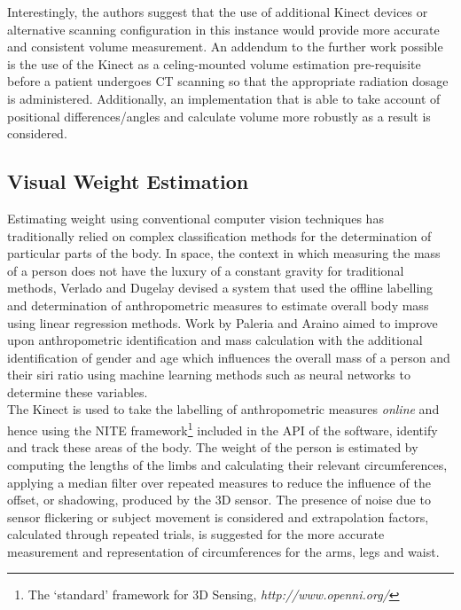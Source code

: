 Interestingly, the authors suggest that the use of additional Kinect devices or alternative scanning configuration in this instance would provide more accurate and consistent volume measurement. An addendum to the further work possible is the use of the Kinect as a celing-mounted volume estimation pre-requisite before a patient undergoes CT scanning so that the appropriate radiation dosage is administered. Additionally, an implementation that is able to take account of positional differences/angles and calculate volume more robustly as a result is considered.

\subsection{Visual Weight Estimation}

Estimating weight using conventional computer vision techniques has traditionally relied on complex classification methods for the determination of particular parts of the body. In space, the context in which measuring the mass of a person does not have the luxury of a constant gravity for traditional methods, Verlado and Dugelay \cite{Veraldo2012} devised a system that used the offline labelling and determination of anthropometric measures to estimate overall body mass using linear regression methods. Work by Paleria and Araino \cite{Paleria2011} aimed to improve upon anthropometric identification and mass calculation with the additional identification of gender and age which influences the overall mass of a person and their siri ratio using machine learning methods such as neural networks to determine these variables. \\

The Kinect is used to take the labelling of anthropometric measures \emph{online} and hence using the NITE framework\footnote{The `standard' framework for 3D Sensing, \emph{http://www.openni.org/}} included in the API of the software, identify and track these areas of the body. The weight of the person is estimated by computing the lengths of the limbs and calculating their relevant circumferences, applying a median filter over repeated measures to reduce the influence of the offset, or shadowing, produced by the 3D sensor. The presence of noise due to sensor flickering or subject movement is considered and extrapolation factors, calculated through repeated trials, is suggested for the more accurate measurement and representation of circumferences for the arms, legs and waist.\\


